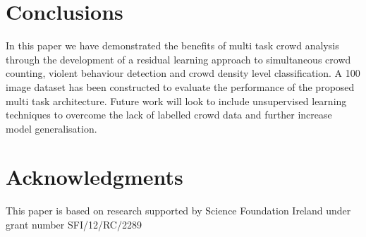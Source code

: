 \documentclass[10pt,twocolumn,letterpaper]{article}
\begin{document}
 

 


\section{Conclusions}
In this paper we have demonstrated the benefits of multi task crowd analysis through the development of a residual learning approach to simultaneous crowd counting, violent behaviour detection and crowd density level classification. A 100 image dataset has been constructed to evaluate the performance of the proposed multi task architecture. Future work will look to include unsupervised learning techniques to overcome the lack of labelled crowd data and further increase model generalisation.

\section{Acknowledgments}
This paper is based on research supported by Science Foundation Ireland under grant number SFI/12/RC/2289



{\small


}
\end{document}
